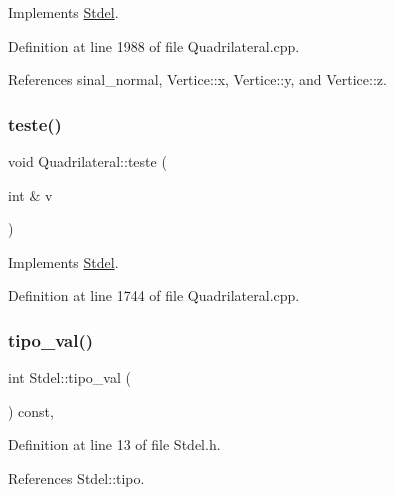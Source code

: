 Implements \hyperlink{classStdel_a4e4aa3bbd0299054ec5447bd73efc6a0}{Stdel}.



Definition at line 1988 of file Quadrilateral.\+cpp.



References sinal\+\_\+normal, Vertice\+::x, Vertice\+::y, and Vertice\+::z.

\mbox{\label{classQuadrilateral_ae960ae1aa7f86570ca6badbfd5801bb3}} 
\subsubsection{\texorpdfstring{teste()}{teste()}}
{\footnotesize\ttfamily void Quadrilateral\+::teste (\begin{DoxyParamCaption}\item[{int \&}]{v }\end{DoxyParamCaption})\hspace{0.3cm}{\ttfamily [virtual]}}



Implements \hyperlink{classStdel_ae62bc70bb31e48d165593ed1ecd482f8}{Stdel}.



Definition at line 1744 of file Quadrilateral.\+cpp.

\mbox{\label{classStdel_a75023fc369db2752845a9ce278f10929}} 
\subsubsection{\texorpdfstring{tipo\+\_\+val()}{tipo\_val()}}
{\footnotesize\ttfamily int Stdel\+::tipo\+\_\+val (\begin{DoxyParamCaption}{ }\end{DoxyParamCaption}) const\hspace{0.3cm}{\ttfamily [inline]}, {\ttfamily [inherited]}}



Definition at line 13 of file Stdel.\+h.



References Stdel\+::tipo.

\mbox{\label{classQuadrilateral_aaa950602df5656278e6a36863666c0c4}} 
